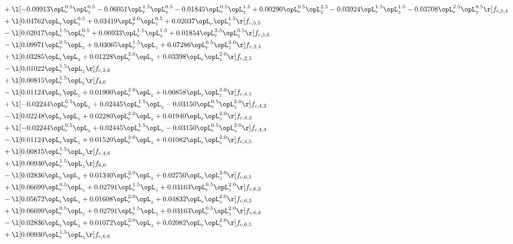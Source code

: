 \begin{alignat}{2}
& + \l[  -0.09913 \opL_r^{0.5} \opL_z^{0.5}   -0.06051 \opL_r^{1.5} \opL_z^{0.5}   -0.01845 \opL_r^{0.5} \opL_z^{1.5} +  0.00290 \opL_r^{0.5} \opL_z^{2.5}   -0.03924 \opL_r^{1.5} \opL_z^{1.5}   -0.03708 \opL_r^{2.5} \opL_z^{0.5}  \r] f_{c,5,4} \nonumber \\ 
& + \l[  0.04762 \opL_r \opL_z^{0.5} +  0.03419 \opL_r^{2.0} \opL_z^{0.5} +  0.02037 \opL_r \opL_z^{1.5}  \r] f_{c,5,5} \nonumber \\ 
& - \l[  0.02017 \opL_r^{1.5} \opL_z^{0.5} +  0.00933 \opL_r^{1.5} \opL_z^{1.5} +  0.01854 \opL_r^{2.5} \opL_z^{0.5}  \r] f_{c,5,6} \nonumber \\ 
& - \l[  0.09971 \opL_r^{0.5} \opL_z +  0.03065 \opL_r^{1.5} \opL_z +  0.07286 \opL_r^{0.5} \opL_z^{2.0}  \r] f_{c,2,4} \nonumber \\ 
& + \l[  0.03285 \opL_r \opL_z +  0.01228 \opL_r^{2.0} \opL_z +  0.03398 \opL_r \opL_z^{2.0}  \r] f_{c,2,5} \nonumber \\ 
& - \l[  0.01022 \opL_r^{1.5} \opL_z  \r] f_{c,2,6} \nonumber \\ 
& + \l[  0.00815 \opL_r^{1.5} \opL_z  \r] f_{4,0} \nonumber \\ 
& - \l[  0.01124 \opL_r \opL_z +  0.01900 \opL_r^{2.0} \opL_z +  0.00858 \opL_r \opL_z^{2.0}  \r] f_{c,4,1} \nonumber \\ 
& + \l[  -0.02244 \opL_r^{0.5} \opL_z +  0.02445 \opL_r^{1.5} \opL_z   -0.03150 \opL_r^{0.5} \opL_z^{2.0}  \r] f_{c,4,2} \nonumber \\ 
& - \l[  0.02248 \opL_r \opL_z +  0.02280 \opL_r^{2.0} \opL_z +  0.01940 \opL_r \opL_z^{2.0}  \r] f_{c,4,3} \nonumber \\ 
& + \l[  -0.02244 \opL_r^{0.5} \opL_z +  0.02445 \opL_r^{1.5} \opL_z   -0.03150 \opL_r^{0.5} \opL_z^{2.0}  \r] f_{c,4,4} \nonumber \\ 
& - \l[  0.01124 \opL_r \opL_z +  0.01520 \opL_r^{2.0} \opL_z +  0.01082 \opL_r \opL_z^{2.0}  \r] f_{c,4,5} \nonumber \\ 
& + \l[  0.00815 \opL_r^{1.5} \opL_z  \r] f_{c,4,6} \nonumber \\ 
& + \l[  0.00930 \opL_r^{1.5} \opL_z  \r] f_{6,0} \nonumber \\ 
& - \l[  0.02836 \opL_r \opL_z +  0.01340 \opL_r^{2.0} \opL_z +  0.02750 \opL_r \opL_z^{2.0}  \r] f_{c,6,1} \nonumber \\ 
& + \l[  0.06699 \opL_r^{0.5} \opL_z +  0.02791 \opL_r^{1.5} \opL_z +  0.03163 \opL_r^{0.5} \opL_z^{2.0}  \r] f_{c,6,2} \nonumber \\ 
& - \l[  0.05672 \opL_r \opL_z +  0.01608 \opL_r^{2.0} \opL_z +  0.04832 \opL_r \opL_z^{2.0}  \r] f_{c,6,3} \nonumber \\ 
& + \l[  0.06699 \opL_r^{0.5} \opL_z +  0.02791 \opL_r^{1.5} \opL_z +  0.03163 \opL_r^{0.5} \opL_z^{2.0}  \r] f_{c,6,4} \nonumber \\ 
& - \l[  0.02836 \opL_r \opL_z +  0.01072 \opL_r^{2.0} \opL_z +  0.02082 \opL_r \opL_z^{2.0}  \r] f_{c,6,5} \nonumber \\ 
& + \l[  0.00930 \opL_r^{1.5} \opL_z  \r] f_{c,6,6} \nonumber \\ 
\end{alignat} 


